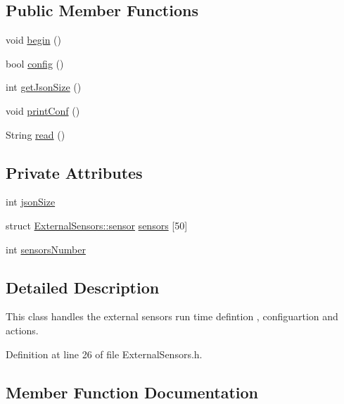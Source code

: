 \subsection*{Public Member Functions}
\begin{DoxyCompactItemize}
\item 
void \hyperlink{classExternalSensors_a58ede0d786a86417254708870f04a21e}{begin} ()
\item 
bool \hyperlink{classExternalSensors_a862a4bd11346b37270d0244c2adabe5a}{config} ()
\item 
int \hyperlink{classExternalSensors_a8e3a93efa8f5a0477f300e26084b6625}{get\+Json\+Size} ()
\item 
void \hyperlink{classExternalSensors_a78c2bf55084435dd51d3c559b2d3c6f3}{print\+Conf} ()
\item 
String \hyperlink{classExternalSensors_a53177b81eca3be89508b5511ddcd00fc}{read} ()
\end{DoxyCompactItemize}
\subsection*{Private Attributes}
\begin{DoxyCompactItemize}
\item 
int \hyperlink{classExternalSensors_acacea86d74d967b57fcff282d26cff57}{json\+Size}
\item 
struct \hyperlink{structExternalSensors_1_1sensor}{External\+Sensors\+::sensor} \hyperlink{classExternalSensors_a284233f884fcf00154a44740cf1d9e1e}{sensors} \mbox{[}50\mbox{]}
\item 
int \hyperlink{classExternalSensors_a58e4fbf9adeae787d92be5fa33043b5d}{sensors\+Number}
\end{DoxyCompactItemize}


\subsection{Detailed Description}
This class handles the external sensors run time defintion , configuartion and actions. 

Definition at line 26 of file External\+Sensors.\+h.



\subsection{Member Function Documentation}
\mbox{\label{classExternalSensors_a58ede0d786a86417254708870f04a21e}} 
